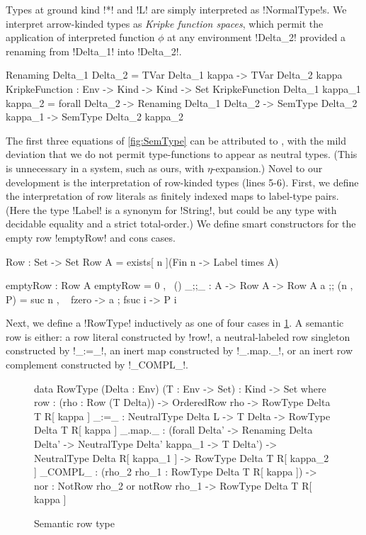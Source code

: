 \documentclass[sigplan,10pt,anonymous,review]{acmart}\settopmatter{printfolios=true,printccs=false,printacmref=false}
\begin{document}
Types at ground kind !*! and !L! are simply interpreted as !NormalType!s. We interpret arrow-kinded types as \emph{Kripke function spaces}, which permit the application of interpreted function $\phi$ at any environment !Delta_2! provided a renaming from !Delta_1! into !Delta_2!. %

\begin{agda}
Renaming Delta_1  Delta_2 = TVar Delta_1 kappa -> TVar Delta_2 kappa
KripkeFunction : Env -> Kind -> Kind -> Set
KripkeFunction Delta_1  kappa_1  kappa_2 =  forall {Delta_2} -> 
  Renaming Delta_1  Delta_2 -> SemType Delta_2  kappa_1 -> SemType Delta_2  kappa_2
\end{agda}

The first three equations of \cref{fig:SemType} can be attributed to \citet{ChapmanKNW19}, with the mild deviation that we do not permit type-functions to appear as neutral types. (This is unnecessary in a system, such as ours, with $\eta$-expansion.) Novel to our development is the interpretation of row-kinded types (lines 5-6). First, we define the interpretation of row literals as finitely indexed maps to label-type pairs. (Here the type !Label! is a synonym for !String!, but could be any type with decidable equality and a strict total-order.) We define smart constructors for the empty row !emptyRow! and cons cases. 

\begin{agda} 
Row : Set -> Set
Row A = exists[ n ](Fin n -> Label times A)

emptyRow : Row A
emptyRow = 0 , \ ()
_;;_ : A -> Row A -> Row A 
a ;; (n , P) = suc n , \ { fzero -> a
                         ; fsuc i -> P i }
\end{agda}

\Ni Next, we define a !RowType! inductively as one of four cases in \cref{fig:semantic-rows}. A semantic row is either: a row literal constructed by !row!, a neutral-labeled row singleton constructed by !_:=_!, an inert map constructed by !_.map._!, or an inert row complement constructed by !_COMPL_!.
\begin{figure}
\begin{agda}
data RowType (Delta : Env) 
             (T : Env -> Set) : Kind -> Set where 
  row      : (rho : Row (T Delta)) -> 
              OrderedRow rho -> 
              RowType Delta T R[ kappa ]
  _:=_     : NeutralType Delta L -> 
             T Delta -> 
             RowType Delta T R[ kappa ]
  _.map._  : (forall {Delta'} -> 
                Renaming Delta Delta' -> 
                NeutralType Delta' kappa_1 -> 
                T Delta') -> 
             NeutralType Delta R[ kappa_1 ] -> 
             RowType Delta T R[ kappa_2 ]
  _COMPL_  : (rho_2  rho_1 : RowType Delta T R[ kappa ]) -> 
             {nor : NotRow rho_2  or  notRow rho_1} -> 
             RowType Delta T R[ kappa ]
\end{agda}
\caption{Semantic row type}
\label{fig:semantic-rows}
\end{figure}
\end{document}

